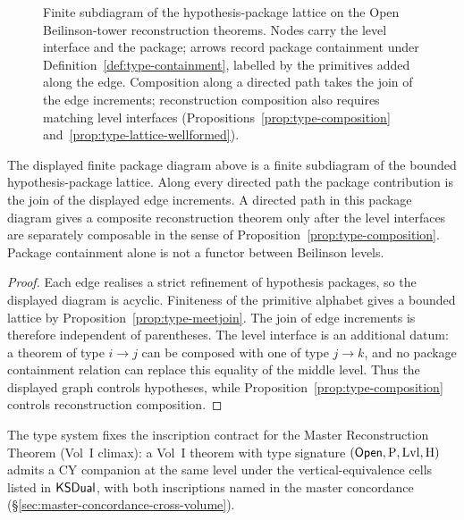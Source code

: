 \begin{figure}[ht]
\caption{Finite subdiagram of the hypothesis-package lattice on the
Open Beilinson-tower reconstruction theorems. Nodes carry the level interface and the
package; arrows record package containment under
Definition~\ref{def:type-containment}, labelled by the primitives
added along the edge. Composition along a directed path takes the
join of the edge increments; reconstruction composition also requires
matching level interfaces
(Propositions~\ref{prop:type-composition}
and~\ref{prop:type-lattice-wellformed}).}
\label{fig:type-lattice}
\end{figure}

\begin{proposition}
\label{prop:type-lattice-wellformed}
\ClaimStatusProvedHere
The displayed finite package diagram above is a finite subdiagram of
the bounded hypothesis-package lattice. Along every directed path
the package contribution is the join of the displayed edge
increments. A directed path in this package diagram gives a composite
reconstruction theorem only after the level interfaces are separately
composable in the sense of Proposition~\ref{prop:type-composition}.
Package containment alone is not a functor between Beilinson levels.
\end{proposition}

\begin{proof}
Each edge realises a strict refinement of hypothesis packages, so
the displayed diagram is acyclic. Finiteness of the primitive
alphabet gives a bounded lattice by Proposition~\ref{prop:type-meetjoin}.
The join of edge increments is therefore independent of parentheses.
The level interface is an additional datum: a theorem of type
$i\to j$ can be composed with one of type $j\to k$, and no package
containment relation can replace this equality of the middle level.
Thus the displayed graph controls hypotheses, while
Proposition~\ref{prop:type-composition} controls reconstruction
composition.
\end{proof}

The type system fixes the inscription contract for the Master
Reconstruction Theorem (Vol~I climax): a Vol~I theorem with type
signature $(\mathsf{Open},\mathrm{P},\mathrm{Lvl},\mathrm{H})$ admits a $\mathrm{CY}$
companion at the same level under the vertical-equivalence cells
listed in $\mathsf{KSDual}$, with both inscriptions named in the master
concordance (\S\ref{sec:master-concordance-cross-volume}).
